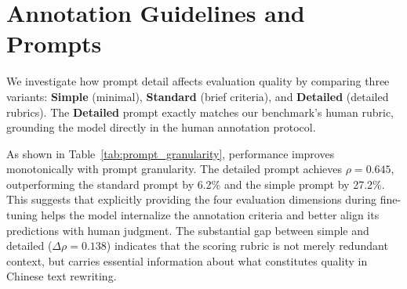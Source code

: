 \documentclass[11pt]{article}
\begin{document}
\begin{table}[h]
\centering
\caption{Representative examples from the evaluation benchmark. \textbf{Source}: original text; \textbf{Rewrite}: model generated rewrite; \textbf{Human}: average human score; \textbf{RJ}: RewriteJudge prediction.}
\label{tab:examples}
\end{table}


\section{Annotation Guidelines and Prompts}
\label{sec:appendix_prompts}

We investigate how prompt detail affects evaluation quality by comparing three variants: \textbf{Simple} (minimal), \textbf{Standard} (brief criteria), and \textbf{Detailed} (detailed rubrics). The \textbf{Detailed} prompt exactly matches our benchmark's human rubric, grounding the model directly in the human annotation protocol.


As shown in Table~\ref{tab:prompt_granularity}, performance improves monotonically with prompt granularity.
The detailed prompt achieves $\rho=0.645$, outperforming the standard prompt by 6.2\% and the simple prompt by 27.2\%.
This suggests that explicitly providing the four evaluation dimensions during fine-tuning helps the model internalize the annotation criteria and better align its predictions with human judgment.
The substantial gap between simple and detailed ($\Delta\rho=0.138$) indicates that the scoring rubric is not merely redundant context, but carries essential information about what constitutes quality in Chinese text rewriting.
\end{document}
